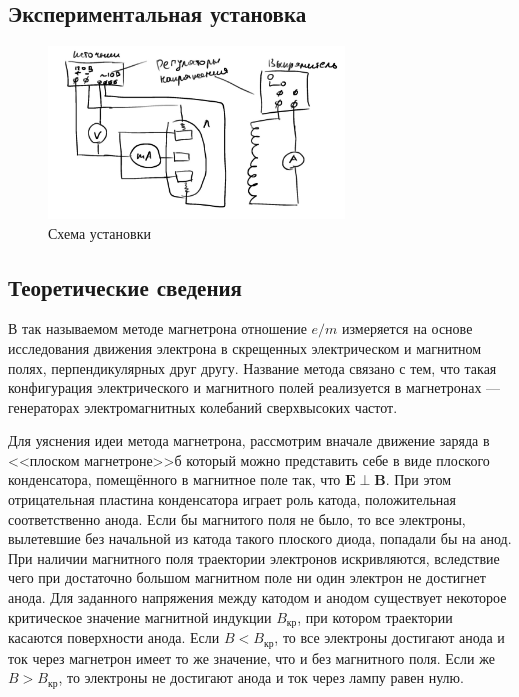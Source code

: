 \documentclass[a4paper, 12pt]{article}
\begin{document}
\subsection{Экспериментальная установка}
\begin{figure}[H]
    \centering
    \includegraphics[width=0.7\textwidth]{set1}
    \caption{Схема установки}
    \label{fig:set1}
\end{figure}
\subsection{Теоретические сведения}
В так называемом методе магнетрона отношение $e / m$ измеряется на основе исследования движения электрона в скрещенных электрическом и магнитном полях, перпендикулярных друг другу. Название метода связано с тем, что такая конфигурация электрического и магнитного полей реализуется в магнетронах --- генераторах электромагнитных колебаний сверхвысоких частот.

Для уяснения идеи метода магнетрона, рассмотрим вначале движение заряда в <<плоском магнетроне>>б который можно представить себе в виде плоского конденсатора, помещённого в магнитное поле так, что $\boldsymbol{E} \perp \boldsymbol{B}$. При этом отрицательная пластина конденсатора играет роль катода, положительная соответственно анода.  Если бы магнитого поля не было, то все электроны, вылетевшие без начальной из катода такого плоского диода, попадали бы на анод. При наличии магнитного поля траектории электронов искривляются, вследствие чего при достаточно большом магнитном поле ни один электрон не достигнет анода.
Для заданного напряжения между катодом и анодом существует некоторое критическое значение магнитной индукции $B_\text{кр}$, при котором траектории касаются поверхности анода. Если $B < B_\text{кр}$, то все электроны достигают анода и ток через магнетрон имеет то же значение, что и без магнитного поля. Если же $B > B_\text{кр}$, то электроны не достигают анода и ток через лампу равен нулю.
\end{document}
